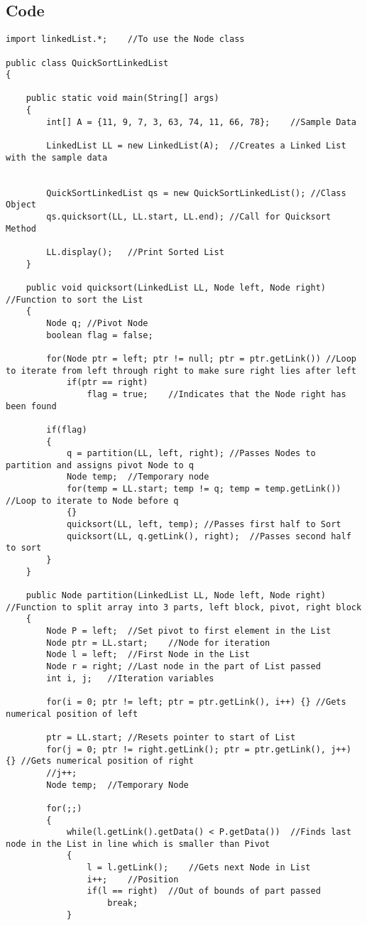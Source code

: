 \documentclass[ProgramminAssignment.tex]{subfiles}
\begin{document}
\subsection{Code}
\begin{lstlisting}
import linkedList.*;	//To use the Node class

public class QuickSortLinkedList	
{

	public static void main(String[] args)
	{
		int[] A = {11, 9, 7, 3, 63, 74, 11, 66, 78};	//Sample Data
		
		LinkedList LL = new LinkedList(A);	//Creates a Linked List with the sample data
		
		
		QuickSortLinkedList qs = new QuickSortLinkedList();	//Class Object
		qs.quicksort(LL, LL.start, LL.end);	//Call for Quicksort Method
		
		LL.display();	//Print Sorted List
	}
	
	public void quicksort(LinkedList LL, Node left, Node right)	//Function to sort the List
	{
		Node q;	//Pivot Node
		boolean flag = false;	
		
		for(Node ptr = left; ptr != null; ptr = ptr.getLink()) //Loop to iterate from left through right to make sure right lies after left
			if(ptr == right)
				flag = true;	//Indicates that the Node right has been found
		
		if(flag)
		{	
			q = partition(LL, left, right);	//Passes Nodes to partition and assigns pivot Node to q
			Node temp;	//Temporary node
			for(temp = LL.start; temp != q; temp = temp.getLink()) //Loop to iterate to Node before q
			{}
			quicksort(LL, left, temp); //Passes first half to Sort
			quicksort(LL, q.getLink(), right);	//Passes second half to sort
		}
	}

	public Node partition(LinkedList LL, Node left, Node right)	//Function to split array into 3 parts, left block, pivot, right block
	{
		Node P = left;	//Set pivot to first element in the List
		Node ptr = LL.start;	//Node for iteration
		Node l = left;	//First Node in the List
		Node r = right;	//Last node in the part of List passed
		int i, j;	//Iteration variables
		
		for(i = 0; ptr != left; ptr = ptr.getLink(), i++) {} //Gets numerical position of left
		
		ptr = LL.start;	//Resets pointer to start of List
		for(j = 0; ptr != right.getLink(); ptr = ptr.getLink(), j++) {}	//Gets numerical position of right
		//j++;
		Node temp;	//Temporary Node
		
		for(;;)
		{
			while(l.getLink().getData() < P.getData())	//Finds last node in the List in line which is smaller than Pivot
			{
				l = l.getLink();	//Gets next Node in List
				i++;	//Position
				if(l == right)	//Out of bounds of part passed
					break;
			}
			

\end{lstlisting}
\end{document}
